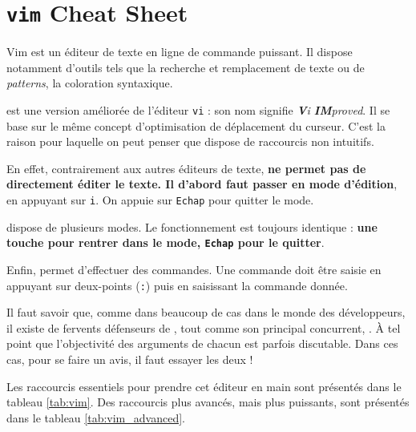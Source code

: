 \section{\texttt{vim} Cheat Sheet} \label{appendix:vim}

Vim est un éditeur de texte en ligne de commande puissant. Il dispose notamment d'outils tels que la recherche et remplacement de texte ou de \textit{patterns}, la coloration syntaxique.

 est une version améliorée de l'éditeur \texttt{vi} : son nom signifie \textit{\textbf{V}i \textbf{IM}proved}. Il se base sur le même concept d'optimisation de déplacement du curseur. C'est la raison pour laquelle on peut penser que  dispose de raccourcis non intuitifs.

En effet, contrairement aux autres éditeurs de texte,  \textbf{ne permet pas de directement éditer le texte. Il d'abord faut passer en mode d'édition}, en appuyant sur \texttt{i}. On appuie sur \texttt{Echap} pour quitter le mode.

 dispose de plusieurs modes. Le fonctionnement est toujours identique : \textbf{une touche pour rentrer dans le mode, \texttt{Echap} pour le quitter}.

Enfin,  permet d'effectuer des commandes. Une commande doit être saisie en appuyant sur deux-points (\texttt{:}) puis en saisissant la commande donnée.

 Il faut savoir que, comme dans beaucoup de cas dans le monde des développeurs, il existe de fervents défenseurs de , tout comme son principal concurrent, . À tel point que l'objectivité des arguments de chacun est parfois discutable. Dans ces cas, pour se faire un avis, il faut essayer les deux !

Les raccourcis essentiels pour prendre cet éditeur en main sont présentés dans le tableau \ref{tab:vim}. Des raccourcis plus avancés, mais plus puissants, sont présentés dans le tableau \ref{tab:vim_advanced}.

